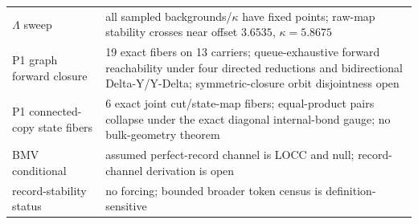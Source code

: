 \begin{longtable}[]{@{}ll@{}}
\begin{minipage}[t]{0.47\columnwidth}\raggedright
\(\Lambda\) sweep\strut
\end{minipage} & \begin{minipage}[t]{0.47\columnwidth}\raggedright
all sampled backgrounds/\(\kappa\) have fixed points; raw-map stability crosses near offset \(3.6535\), \(\kappa=5.8675\)\strut
\end{minipage}\tabularnewline
\begin{minipage}[t]{0.47\columnwidth}\raggedright
P1 graph forward closure\strut
\end{minipage} & \begin{minipage}[t]{0.47\columnwidth}\raggedright
19 exact fibers on 13 carriers; queue-exhaustive forward reachability under four directed reductions and bidirectional
Delta-Y/Y-Delta; symmetric-closure orbit disjointness open\strut
\end{minipage}\tabularnewline
\begin{minipage}[t]{0.47\columnwidth}\raggedright
P1 connected-copy state fibers\strut
\end{minipage} & \begin{minipage}[t]{0.47\columnwidth}\raggedright
6 exact joint cut/state-map fibers; equal-product pairs collapse under the exact diagonal internal-bond gauge; no
bulk-geometry theorem\strut
\end{minipage}\tabularnewline
\begin{minipage}[t]{0.47\columnwidth}\raggedright
BMV conditional\strut
\end{minipage} & \begin{minipage}[t]{0.47\columnwidth}\raggedright
assumed perfect-record channel is LOCC and null; record-channel derivation is open\strut
\end{minipage}\tabularnewline
\begin{minipage}[t]{0.47\columnwidth}\raggedright
record-stability status\strut
\end{minipage} & \begin{minipage}[t]{0.47\columnwidth}\raggedright
no forcing; bounded broader token census is definition-sensitive\strut
\end{minipage}\tabularnewline
\bottomrule
\end{longtable}
